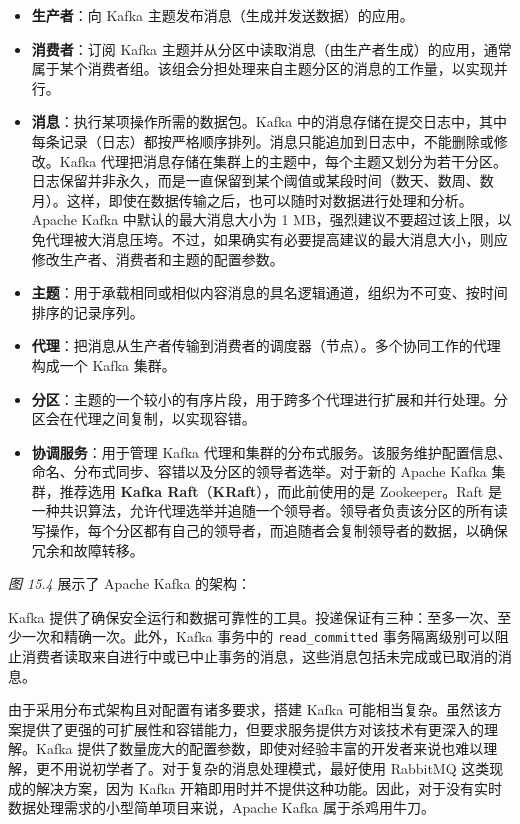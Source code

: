 \begin{itemize}
\item \textbf{生产者}：向 Kafka 主题发布消息（生成并发送数据）的应用。
\item \textbf{消费者}：订阅 Kafka 主题并从分区中读取消息（由生产者生成）的应用，通常属于某个消费者组。该组会分担处理来自主题分区的消息的工作量，以实现并行。
\label{idx:1539}
\label{idx:1540}
\item \textbf{消息}：执行某项操作所需的数据包。Kafka 中的消息存储在提交日志中，其中每条记录（日志）都按严格顺序排列。消息只能追加到日志中，不能删除或修改。Kafka 代理把消息存储在集群上的主题中，每个主题又划分为若干分区。日志保留并非永久，而是一直保留到某个阈值或某段时间（数天、数周、数月）。这样，即使在数据传输之后，也可以随时对数据进行处理和分析。Apache Kafka 中默认的最大消息大小为 1 MB，强烈建议不要超过该上限，以免代理被大消息压垮。不过，如果确实有必要提高建议的最大消息大小，则应修改生产者、消费者和主题的配置参数。
\item \textbf{主题}：用于承载相同或相似内容消息的具名逻辑通道，组织为不可变、按时间排序的记录序列。
\item \textbf{代理}：把消息从生产者传输到消费者的调度器（节点）。多个协同工作的代理构成一个 Kafka 集群。
\item \textbf{分区}：主题的一个较小的有序片段，用于跨多个代理进行扩展和并行处理。分区会在代理之间复制，以实现容错。
\label{idx:1541}
\item \textbf{协调服务}：用于管理 Kafka 代理和集群的分布式服务。该服务维护配置信息、命名、分布式同步、容错以及分区的领导者选举。对于新的 Apache Kafka 集群，推荐选用 \textbf{Kafka Raft}（\textbf{KRaft}），而此前使用的是 Zookeeper。Raft 是一种共识算法，允许代理选举并追随一个领导者。领导者负责该分区的所有读写操作，每个分区都有自己的领导者，而追随者会复制领导者的数据，以确保冗余和故障转移。
\end{itemize}

\emph{图 15.4} 展示了 Apache Kafka 的架构：


\label{idx:1542}
\label{idx:1543}
Kafka 提供了确保安全运行和数据可靠性的工具。投递保证有三种：至多一次、至少一次和精确一次。此外，Kafka 事务中的 \texttt{read\_\allowbreak{}committed} 事务隔离级别可以阻止消费者读取来自进行中或已中止事务的消息，这些消息包括未完成或已取消的消息。

由于采用分布式架构且对配置有诸多要求，搭建 Kafka 可能相当复杂。虽然该方案提供了更强的可扩展性和容错能力，但要求服务提供方对该技术有更深入的理解。Kafka 提供了数量庞大的配置参数，即使对经验丰富的开发者来说也难以理解，更不用说初学者了。对于复杂的消息处理模式，最好使用 RabbitMQ 这类现成的解决方案，因为 Kafka 开箱即用时并不提供这种功能。因此，对于没有实时数据处理需求的小型简单项目来说，Apache Kafka 属于杀鸡用牛刀。

